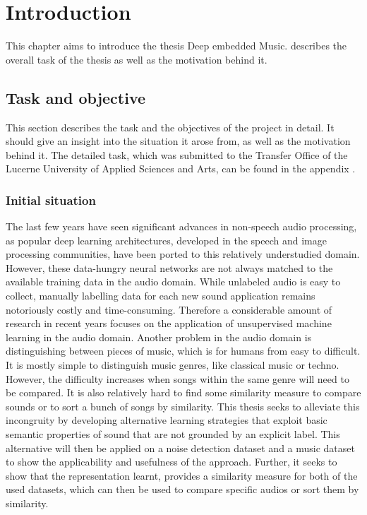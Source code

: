 \chapter{Introduction}
\label{ch:Introduction}
This chapter aims to introduce the thesis \flqq Deep embedded Music\frqq.  describes the overall task of the thesis as well as the motivation behind it.

\section{Task and objective}
\label{sec:Task-Objective}
This section describes the task and the objectives of the project in detail. It should give an insight into the situation it arose from, as well as the motivation behind it. The detailed task, which was submitted to the Transfer Office of the Lucerne University of Applied Sciences and Arts, can be found in the appendix .

\subsection{Initial situation}
\label{sub:Initial-Stituation}
The last few years have seen significant advances in non-speech audio processing, as popular deep learning architectures, developed in the speech and image processing communities, have been ported to this relatively understudied domain. However, these data-hungry neural networks are not always matched to the available training data in the audio domain. While unlabeled audio is easy to collect, manually labelling data for each new sound application remains notoriously costly and time-consuming. Therefore a considerable amount of research in recent years focuses on the application of unsupervised machine learning in the audio domain.
\newline
\newline
Another problem in the audio domain is distinguishing between pieces of music, which is for humans from easy to difficult. It is mostly simple to distinguish music genres, like classical music or techno. However, the difficulty increases when songs within the same genre will need to be compared. It is also relatively hard to find some similarity measure to compare sounds or to sort a bunch of songs by similarity.
\newline
\newline
This thesis seeks to alleviate this incongruity by developing alternative learning strategies that exploit basic semantic properties of sound that are not grounded by an explicit label. This alternative will then be applied on a noise detection dataset and a music dataset to show the applicability and usefulness of the approach. Further, it seeks to show that the representation learnt, provides a similarity measure for both of the used datasets, which can then be used to compare specific audios or sort them by similarity.

